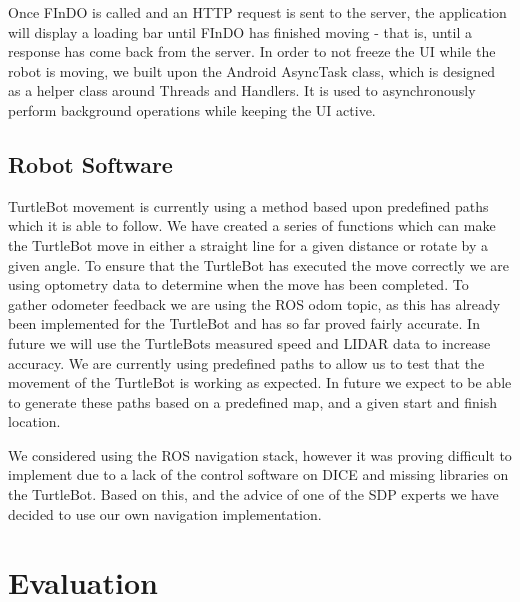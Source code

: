 \documentclass{article}
\begin{document}
Once FInDO is called and an HTTP request is sent to the server, the application will display a loading bar until FInDO has finished moving - that is, until a response has come back from the server. In order to not freeze the UI while the robot is moving, we built upon the Android AsyncTask class, which is designed as a helper class around Threads and Handlers. It is used to asynchronously perform background operations while keeping the UI active.

\subsection{Robot Software}



TurtleBot movement is currently using a method based upon predefined paths which it is able to follow.
We have created a series of functions which can make the TurtleBot move in either a straight line for a given distance or rotate by a given angle.
To ensure that the TurtleBot has executed the move correctly we are using optometry data to determine when the move has been completed. 
To gather odometer feedback we are using the ROS odom topic, as this has already been implemented for the TurtleBot and has so far proved fairly accurate.
In future we will use the TurtleBots measured speed and LIDAR data to increase accuracy.
We are currently using predefined paths to allow us to test that the movement of the TurtleBot is working as expected. In future we expect to be able to generate these paths based on a predefined map, and a given start and finish location.

We considered using the ROS navigation stack, however it was proving difficult to implement due to a lack of the control software on DICE and missing libraries on the TurtleBot. 
Based on this, and the advice of one of the SDP experts we have decided to use our own navigation implementation.

\section{Evaluation}
\end{document}
